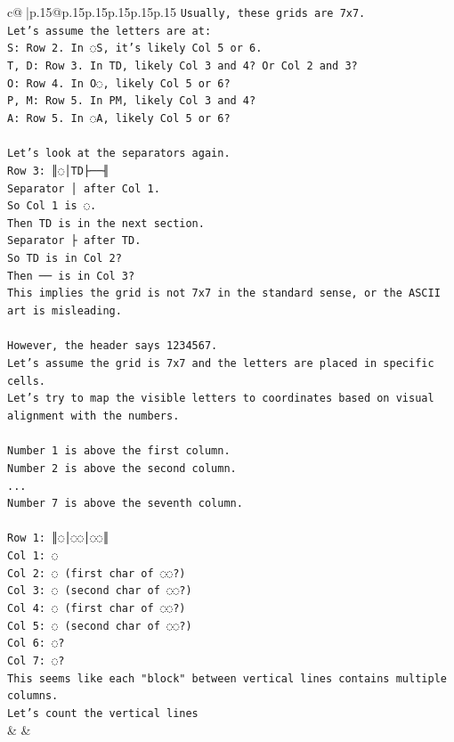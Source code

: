 \documentclass{article}
\begin{document}
{\begin{supertabular}{c@{$\;$}|p{.15\linewidth}@{}p{.15\linewidth}p{.15\linewidth}p{.15\linewidth}p{.15\linewidth}p{.15\linewidth}}
{{{\texttt{Usually, these grids are 7x7.} \\
\texttt{Let's assume the letters are at:} \\
\texttt{S: Row 2. In ◌S, it's likely Col 5 or 6.} \\
\texttt{T, D: Row 3. In TD, likely Col 3 and 4? Or Col 2 and 3?} \\
\texttt{O: Row 4. In O◌, likely Col 5 or 6?} \\
\texttt{P, M: Row 5. In PM, likely Col 3 and 4?} \\
\texttt{A: Row 5. In ◌A, likely Col 5 or 6?} \\
\\ 
\texttt{Let's look at the separators again.} \\
\texttt{Row 3: ║◌│TD├──╢} \\
\texttt{Separator │ after Col 1.} \\
\texttt{So Col 1 is ◌.} \\
\texttt{Then TD is in the next section.} \\
\texttt{Separator ├ after TD.} \\
\texttt{So TD is in Col 2?} \\
\texttt{Then ── is in Col 3?} \\
\texttt{This implies the grid is not 7x7 in the standard sense, or the ASCII art is misleading.} \\
\\ 
\texttt{However, the header says 1234567.} \\
\texttt{Let's assume the grid is 7x7 and the letters are placed in specific cells.} \\
\texttt{Let's try to map the visible letters to coordinates based on visual alignment with the numbers.} \\
\\ 
\texttt{Number 1 is above the first column.} \\
\texttt{Number 2 is above the second column.} \\
\texttt{...} \\
\texttt{Number 7 is above the seventh column.} \\
\\ 
\texttt{Row 1: ║◌│◌◌│◌◌║} \\
\texttt{Col 1: ◌} \\
\texttt{Col 2: ◌ (first char of ◌◌?)} \\
\texttt{Col 3: ◌ (second char of ◌◌?)} \\
\texttt{Col 4: ◌ (first char of ◌◌?)} \\
\texttt{Col 5: ◌ (second char of ◌◌?)} \\
\texttt{Col 6: ◌?} \\
\texttt{Col 7: ◌?} \\
\texttt{This seems like each "block" between vertical lines contains multiple columns.} \\
\texttt{Let's count the vertical lines} \\
            }
        }
    }
    & & \\ \\


\end{supertabular}}
\end{document}
